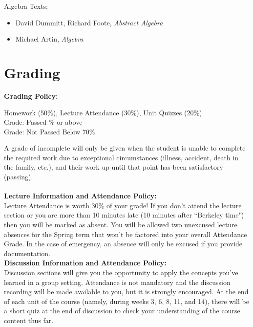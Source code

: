 \documentclass[11pt, a4paper]{article}
\begin{document}
\noindent Algebra Texts:
\begin{itemize}
    \item David Dummitt, Richard Foote, \textit{Abstract Algebra}
    \item Michael Artin, \textit{Algebra}
\end{itemize}

\section*{Grading}
\noindent\textbf{Grading Policy:} 
\begin{center}
Homework (50\%), Lecture Attendance (30\%), Unit Quizzes (20\%)  \\
Grade: Passed \% or above \\
Grade: Not Passed  \dotfill Below 70\% 
\end{center}
A grade of incomplete will only be given when the student is unable to complete the required work due to exceptional circumstances (illness, accident, death
in the family, etc.), and their work up until that point has been satisfactory (passing). 
\\ \\
\noindent\textbf{Lecture Information and Attendance Policy:}
\\
Lecture Attendance is worth 30\% of your grade! If you don't attend the lecture section or you are more than 10 minutes late (10 minutes after ``Berkeley time") then you will be marked as absent. You will be allowed two unexcused lecture absences for the Spring term that won't be factored into your overall Attendance Grade. In the case of emergency, an absence will only be excused if you provide documentation. 
\\

\noindent\textbf{Discussion Information and Attendance Policy:} \\
Discussion sections will give you the opportunity to apply the concepts you’ve learned in a group setting. Attendance is not mandatory and the discussion recording will be made available to you, but it is strongly encouraged. At the end of each unit of the course (namely, during weeks 3, 6, 8, 11, and 14), there will be a short quiz at the end of discussion to check your understanding of the course content thus far.
\\
\end{document}
